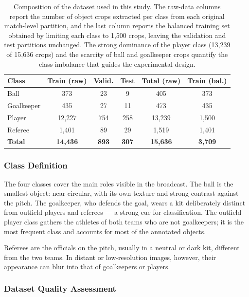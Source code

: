 \documentclass[preprint,12pt]{elsarticle}
\begin{document}
\begin{table}[!ht]
\centering
\caption{Composition of the dataset used in this study. The raw-data columns report the number of object crops extracted per class from each original match-level partition, and the last column reports the balanced training set obtained by limiting each class to 1,500 crops, leaving the validation and test partitions unchanged. The strong dominance of the player class (13,239 of 15,636 crops) and the scarcity of ball and goalkeeper crops quantify the class imbalance that guides the experimental design.}
\label{tab:dataset}
\begin{tabular}{lccccc}
\toprule
\textbf{Class} & \textbf{Train (raw)} & \textbf{Valid.} & \textbf{Test} & \textbf{Total (raw)} & \textbf{Train (bal.)} \\
\midrule
Ball       & 373    & 23  & 9   & 405    & 373 \\
Goalkeeper & 435    & 27  & 11  & 473    & 435 \\
Player     & 12,227 & 754 & 258 & 13,239 & 1,500 \\
Referee    & 1,401  & 89  & 29  & 1,519  & 1,401 \\
\midrule
\textbf{Total} & \textbf{14,436} & \textbf{893} & \textbf{307} & \textbf{15,636} & \textbf{3,709} \\
\bottomrule
\end{tabular}
\end{table}

\subsubsection{Class Definition}

The four classes cover the main roles visible in the broadcast. The ball is the smallest object: near-circular, with its own texture and strong contrast against the pitch. The goalkeeper, who defends the goal, wears a kit deliberately distinct from outfield players and referees --- a strong cue for classification. The outfield-player class gathers the athletes of both teams who are not goalkeepers; it is the most frequent class and accounts for most of the annotated objects.

Referees are the officials on the pitch, usually in a neutral or dark kit, different from the two teams. In distant or low-resolution images, however, their appearance can blur into that of goalkeepers or players.

\subsubsection{Dataset Quality Assessment}
\end{document}
